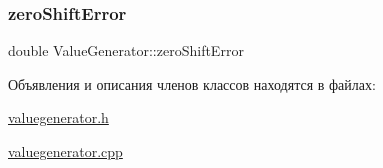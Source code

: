 \subsubsection{\texorpdfstring{zero\+Shift\+Error}{zeroShiftError}}
{\footnotesize\ttfamily double Value\+Generator\+::zero\+Shift\+Error}



Объявления и описания членов классов находятся в файлах\+:\begin{DoxyCompactItemize}
\item 
\hyperlink{valuegenerator_8h}{valuegenerator.\+h}\item 
\hyperlink{valuegenerator_8cpp}{valuegenerator.\+cpp}\end{DoxyCompactItemize}
